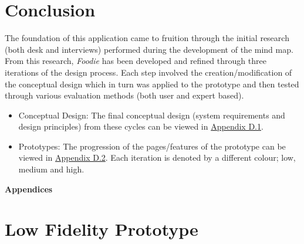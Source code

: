 \documentclass[a4 paper, 12pt]{article}
\begin{document}
\section{Conclusion}
The foundation of this application came to fruition through the initial research (both desk and interviews) performed during the development of the mind map. From this research, \textit{Foodie} has been developed and refined through three iterations of the design process. Each step involved the creation/modification of the conceptual design which in turn was applied to the prototype and then tested through various evaluation methods (both user and expert based). 
    \begin{itemize}
        \item Conceptual Design: The final conceptual design (system requirements and design principles) from these cycles can be viewed in \hyperref[sec:D.1]{Appendix D.1}.
        \item Prototypes: The progression of the pages/features of the prototype can be viewed in \hyperref[sec:D.2]{Appendix D.2}. Each iteration is denoted by a different colour; \textcolor{mygreen}{low}, \textcolor{myblue}{medium} and \textcolor{myorange}{high}. 
    \end{itemize}


















\appendix
\addappheadtotoc

\pagebreak
\begin{center}
    \Huge \textbf{Appendices}
    \section{Low Fidelity Prototype}
\end{center}

    \pagebreak
            
\end{document}
